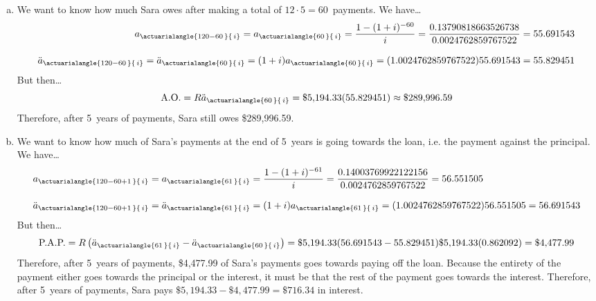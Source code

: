 \documentclass[11pt,letterpaper]{article}
\newcommand{\actA}[2]{a_{\actuarialangle{#1\,}{\,#2}}} %
\newcommand{\actAD}[2]{\ddot{a}_{\actuarialangle{#1\,}{\,#2}}} %
\begin{document}
\begin{enumerate}[(a)]
\item We want to know how much Sara owes after making a total of $12 \cdot 5= 60$~payments. We have\dots
	\[
	\begin{aligned}
	\actA{120 - 60}{i}= \actA{60}{i}= \dfrac{1 - (1 + i)^{-60}}{i}= \dfrac{0.13790818663526738}{0.0024762859767522}= 55.691543 \\[0.3cm]
	\actAD{120 - 60}{i}= \actAD{60}{i}= (1 + i) \actA{60}{i}= (1.0024762859767522) 55.691543= 55.829451
	\end{aligned}
	\] 
But then\dots
	\[
	\text{A.O.}= R \actAD{60}{i}= \$5,\!194.33 (55.829451) \approx \$289,\!996.59
	\]
Therefore, after 5~years of payments, Sara still owes \$289,996.59. \pspace

\item We want to know how much of Sara's payments at the end of 5~years is going towards the loan, i.e. the payment against the principal. We have\dots
	\[
	\begin{aligned}
	\actA{120 - 60 + 1}{i}&= \actA{61}{i}= \dfrac{1 - (1 + i)^{-61}}{i}= \dfrac{0.14003769922122156}{0.0024762859767522}= 56.551505 \\[0.3cm]
	\actAD{120 - 60 + 1}{i}&= \actAD{61}{i}= (1 + i) \actA{61}{i}= (1.0024762859767522) 56.551505= 56.691543
	\end{aligned}
	\]
But then\dots
	\[
	\text{P.A.P.}= R \left( \actAD{61}{i} - \actAD{60}{i} \right)= \$5,\!194.33 (56.691543 - 55.829451) \$5,\!194.33 (0.862092)= \$4,\!477.99
	\]
Therefore, after 5~years of payments, \$4,477.99 of Sara's payments goes towards paying off the loan. Because the entirety of the payment either goes towards the principal or the interest, it must be that the rest of the payment goes towards the interest. Therefore, after 5~years of payments, Sara pays $\$5,\!194.33 - \$4,\!477.99= \$716.34$ in interest. 
\end{enumerate}
\end{document}
